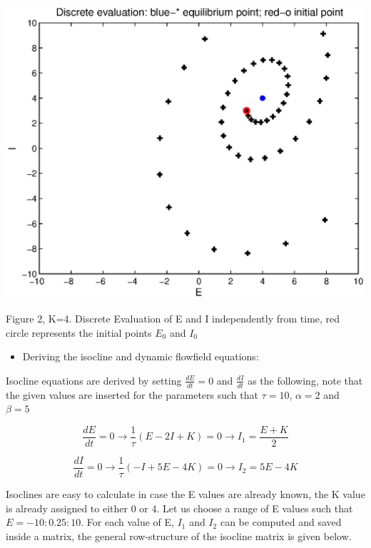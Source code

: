 \documentclass{article}
\begin{document}
\begin{center}
 \includegraphics[width=\textwidth]{nonlinear2.eps}
\begin{footnotesize}Figure 2, K=4. Discrete Evaluation of E and I independently from time, red circle represents the initial points $E_0$ and $I_0$\end{footnotesize}
\end{center}


\begin{itemize}
 \item Deriving the isocline and  dynamic flowfield equations:
\end{itemize}

Isocline equations are derived by setting $ \frac{dE}{dt}=0 $ and $ \frac{dI}{dt} $ as the following, note that the given values are inserted for the parameters such that $\tau=10$, $\alpha=2$ and $\beta=5$

\begin{equation*}
  \frac{dE}{dt}=0\longrightarrow \frac{1}{\tau}(E-2I+K)=0\longrightarrow I_1=\frac{E+K}{2}
\end{equation*}

\begin{equation*}
  \frac{dI}{dt}=0\longrightarrow \frac{1}{\tau}(-I+5E-4K)=0\longrightarrow I_2=5E-4K
\end{equation*}

Isoclines are easy to calculate in case the E values are already known, the K value is already assigned to either 0 or 4. Let us choose a range of E values such that $E=-10:0.25:10$. For each value of E, $I_1$ and $I_2$ can be computed and saved inside a matrix, the general row-structure of the isocline matrix is given below.
\end{document}
